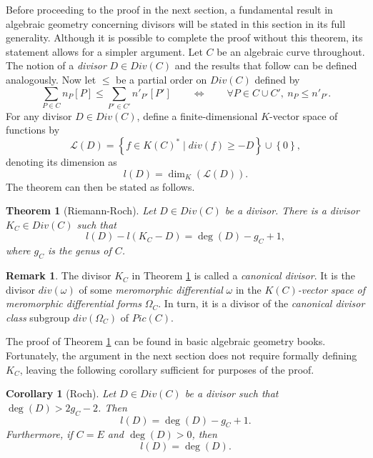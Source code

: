 \documentclass{article}
\theoremstyle{plain}
\newtheorem{corollary}[n]{Corollary}
\newtheorem{theorem}[n]{Theorem}
\theoremstyle{definition}
\newtheorem{remark}[n]{Remark}
\newcommand{\rb}[1]{\left( #1 \right)}
\renewcommand{\sb}[1]{\left[ #1 \right]}
\newcommand{\cb}[1]{\left\{ #1 \right\}}
\newcommand{\LL}{\mathcal{L}}
\begin{document}
Before proceeding to the proof in the next section, a fundamental result in algebraic geometry concerning divisors will be stated in this section in its full generality. Although it is possible to complete the proof without this theorem, its statement allows for a simpler argument. Let $ C $ be an algebraic curve throughout. The notion of a \emph{divisor} $ D \in Div\rb{C} $ and the results that follow can be defined analogously. Now let $ \le $ be a partial order on $ Div\rb{C} $ defined by
$$ \sum_{P \in C} n_P\sb{P} \le \sum_{P' \in C'} n'_{P'}\sb{P'} \qquad \iff \qquad \forall P \in C \cup C', \ n_P \le n'_{P'}. $$
For any divisor $ D \in Div\rb{C} $, define a finite-dimensional $ K $-vector space of functions by
$$ \LL\rb{D} = \cb{f \in K\rb{C}^* \mid div\rb{f} \ge -D} \cup \cb{0}, $$
denoting its dimension as
$$ l\rb{D} = \dim_K\rb{\LL\rb{D}}. $$
The theorem can then be stated as follows.

\begin{theorem}[Riemann-Roch]
\label{thm:riemannroch}
Let $ D \in Div\rb{C} $ be a divisor. There is a divisor $ K_C \in Div\rb{C} $ such that
$$ l\rb{D} - l\rb{K_C - D} = \deg\rb{D} - g_C + 1, $$
where $ g_C $ is the genus of $ C $.
\end{theorem}

\begin{remark}
The divisor $ K_C $ in Theorem \ref{thm:riemannroch} is called a \emph{canonical divisor}. It is the divisor $ div\rb{\omega} $ of some \emph{meromorphic differential} $ \omega $ in the \emph{$ K\rb{C} $-vector space of meromorphic differential forms} $ \Omega_C $. In turn, it is a divisor of the \emph{canonical divisor class} subgroup $ div\rb{\Omega_C} $ of $ Pic\rb{C} $.
\end{remark}

The proof of Theorem \ref{thm:riemannroch} can be found in basic algebraic geometry books. Fortunately, the argument in the next section does not require formally defining $ K_C $, leaving the following corollary sufficient for purposes of the proof.

\begin{corollary}[Roch]
\label{thm:roch}
Let $ D \in Div\rb{C} $ be a divisor such that $ \deg\rb{D} > 2g_C - 2 $. Then
$$ l\rb{D} = \deg\rb{D} - g_C + 1. $$
Furthermore, if $ C = E $ and $ \deg\rb{D} > 0 $, then
$$ l\rb{D} = \deg\rb{D}. $$
\end{corollary}
\end{document}
